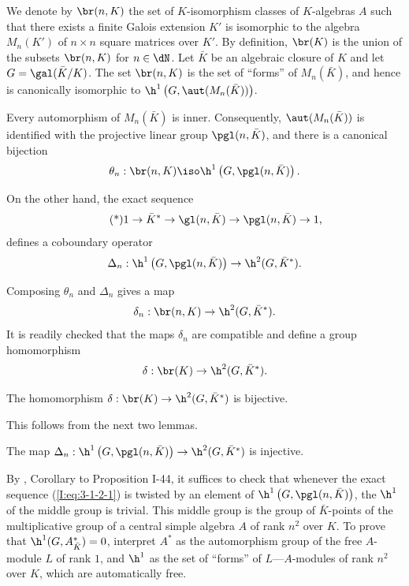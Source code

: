 We denote by $\br(n,K)$ the set of $K$-isomorphism classes of
$K$-algebras $A$ such that there exists a finite Galois extension $K'$
 is isomorphic to the algebra $M_n(K')$ of
$n\times n$ square matrices over $K'$. By definition, $\br(K)$ is the
union of the subsets $\br(n,K)$ for $n\in\dN$. Let $\bar K$ be an
algebraic closure of $K$ and let $G=\gal(\bar K/K)$. The set $\br(n,K)$
is the set of “forms” of $M_n(\bar K)$, and hence is canonically
isomorphic to $\h^1\left(G,\aut(M_n(\bar K))\right)$.

Every automorphism of $M_n(\bar K)$ is inner. Consequently,
$\aut(M_n(\bar K))$ is identified with the projective linear group
$\pgl(n,\bar K)$, and there is a canonical bijection
\[
  \theta_n : \br(n,K) \iso \h^1\left(G,\pgl(n,\bar K)\right)\text{.}
\]

On the other hand, the exact sequence
\begin{equation*}\tag{*}\label{I:eq:3-1-2-1}
  1 \to \bar K^* \to \gl(n,\bar K) \to \pgl(n,\bar K) \to 1\text{,}
\end{equation*}
defines a coboundary operator
\[
  \Delta_n : \h^1\left(G,\pgl(n,\bar K)\right) \to \h^2(G,\bar K^*)\text{.}
\]

Composing $\theta_n$ and $\Delta_n$ gives a map
\[
  \delta_n : \br(n,K) \to \h^2(G,\bar K^*)\text{.}
\]
It is readily checked that the maps $\delta_n$ are compatible and define
a group homomorphism
\[
  \delta : \br(K) \to \h^2(G,\bar K^*)\text{.}
\]

\begin{proposition}\label{I:3-1-3}
The homomorphism $\delta:\br(K)\to\h^2(G,\bar K^*)$ is bijective.
\end{proposition}

This follows from the next two lemmas.

\begin{lemma}\label{I:3-1-4}
The map
$\Delta_n:\h^1\left(G,\pgl(n,\bar K)\right)\to
\h^2(G,\bar K^*)$ is injective.
\end{lemma}

By , Corollary to Proposition I-44, it suffices to check that
whenever the exact sequence (\ref{I:eq:3-1-2-1}) is twisted by an element
of $\h^1\left(G,\pgl(n,\bar K)\right)$, the $\h^1$ of the middle group
is trivial. This middle group is the group of $\bar K$-points of the
multiplicative group of a central simple algebra $A$ of rank $n^2$ over
$K$. To prove that $\h^1(G,A_{\bar K}^*)=0$, interpret $A^*$
as the automorphism group of the free $A$-module $L$ of rank $1$, and
$\h^1$ as the set of “forms” of $L$---$A$-modules of rank $n^2$ over
$K$, which are automatically free.

